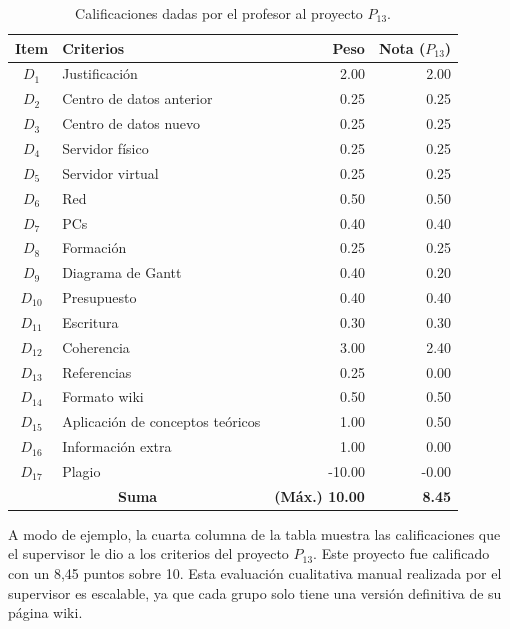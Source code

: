 \begin{table}[h]
\centering
\begin{tabular}{|c|l|r|r|}
\hline
\textbf{Item} & \textbf{Criterios}  & \textbf{Peso}  & \textbf{Nota ($P_{13}$) }   \\ \hline
\hline
 $D_1$ & Justificación &  2.00 & 2.00 \\ \hline
 $D_2$ & Centro de datos anterior &   0.25 & 0.25 \\ \hline 
 $D_3$ & Centro de datos nuevo &    0.25 & 0.25 \\ \hline 
 $D_4$ & Servidor físico &    0.25 & 0.25  \\ \hline
 $D_5$ & Servidor virtual &    0.25 & 0.25  \\ \hline 
 $D_6$ & Red &    0.50 & 0.50  \\ \hline 
 $D_7$ & PCs &  0.40 & 0.40  \\ \hline 
 $D_8$ & Formación &    0.25 & 0.25  \\ \hline 
 $D_9$ & Diagrama de Gantt &    0.40  & 0.20  \\ \hline
 $D_{10}$ & Presupuesto &   0.40  & 0.40 \\ \hline
 $D_{11}$ & Escritura &   0.30  & 0.30 \\ \hline
 $D_{12}$ & Coherencia &   3.00  & 2.40 \\ \hline
 $D_{13}$ & Referencias &    0.25  & 0.00 \\ \hline
 $D_{14}$ & Formato wiki &    0.50  & 0.50 \\ \hline
 $D_{15}$ & Aplicación de conceptos teóricos &    1.00  & 0.50 \\ \hline
 $D_{16}$ & Información extra &    1.00  & 0.00 \\ \hline
 $D_{17}$ & Plagio &    -10.00  & -0.00 \\ \hline
 \hline
 \multicolumn{2}{|c|}{\textbf{Suma}} & \textbf{(Máx.) 10.00} & \textbf{8.45} \\ \hline
\end{tabular}
\caption{Calificaciones dadas por el profesor al proyecto $P_{13}$.}
\label{table:project-rubric-supervisor}
\end{table}

A modo de ejemplo, la cuarta columna de la tabla muestra las calificaciones que el supervisor le dio a los criterios del proyecto $P_{13}$. Este proyecto fue calificado con un 8,45 puntos sobre 10. Esta evaluación cualitativa manual realizada por el supervisor es escalable, ya que cada grupo solo tiene una versión definitiva de su página wiki.

